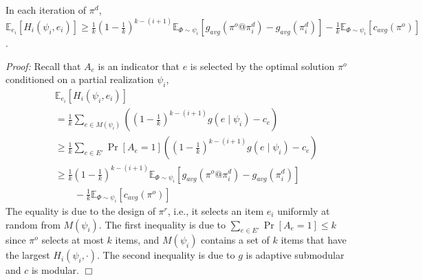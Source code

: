 \documentclass[twoside,leqno,twocolumn]{article}
\begin{document}
\begin{lemma}
\label{lem:c2}
In each iteration of $\pi^d$,
$
\mathbb{E}_{e_i}[H_i(\psi_i, e_i)] \geq \frac{1}{k}(1-\frac{1}{k})^{k-(i+1)} \mathbb{E}_{\Phi\sim \psi_i}[g_{avg}(\pi^o@\pi^d_i)-g_{avg}(\pi^d_i)]-\frac{1}{k}\mathbb{E}_{\Phi\sim \psi_i}[c_{avg}(\pi^o)]$.
\end{lemma}
\emph{Proof:}  Recall that $A_e$ is an indicator that $e$ is selected by the optimal solution $\pi^o$ conditioned on a partial realization $\psi_i$,
\begin{eqnarray*}
&& \mathbb{E}_{e_i}[H_i(\psi_i, e_i)]  \\
&& = \frac{1}{k}\sum_{e\in M(\psi_i)} ((1-\frac{1}{k})^{k-(i+1)} g(e \mid \psi_i)-c_{e})\\
&& \geq  \frac{1}{k}\sum_{e\in E'} \Pr[A_e=1] ((1-\frac{1}{k})^{k-(i+1)} g(e \mid \psi_i)-c_{e})\\
&& \geq \frac{1}{k}(1-\frac{1}{k})^{k-(i+1)}\mathbb{E}_{\Phi\sim \psi_i}[g_{avg}(\pi^o@\pi^d_i)-g_{avg}(\pi^d_i)]\\
&& \quad\quad-\frac{1}{k}\mathbb{E}_{\Phi\sim \psi_i}[c_{avg}(\pi^o)]
\end{eqnarray*} The equality is due to the design of $\pi^r$, i.e.,  it selects an item $e_i$ uniformly at random from $M(\psi_i)$. The first inequality is due to $\sum_{e\in E'}\Pr[A_e=1]\leq k$ since $\pi^o$ selects at most $k$ items, and $M(\psi_i)$ contains a set of $k$ items that have the largest $H_i(\psi_i, \cdot)$. The second inequality is due to $g$ is adaptive submodular and $c$ is modular. $\Box$
\end{document}
